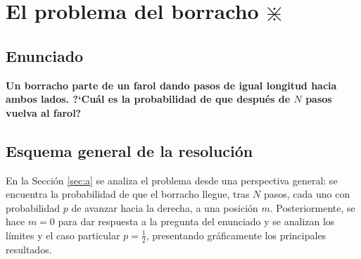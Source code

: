 \newpage














\chapter{El problema del borracho $\divideontimes$} 



\section*{Enunciado}

\begin{ejemplo}
\textbf{Un borracho parte de un farol dando pasos de igual longitud hacia ambos lados. ?`Cuál es la probabilidad de que después de $N$ pasos vuelva al farol?}
\end{ejemplo}


\section{Esquema general de la resolución}

En la Sección \ref{sec:a} se analiza el problema desde una perspectiva general: se encuentra la probabilidad de que el borracho llegue, tras $N$ pasos, cada uno con probabilidad $p$ de avanzar hacia la derecha, a una posición $m$. Posteriormente, se hace $m = 0$ para dar respuesta a la pregunta del enunciado y se analizan los límites y el caso particular $p = \frac{1}{2}$, presentando gráficamente los principales resultados.

